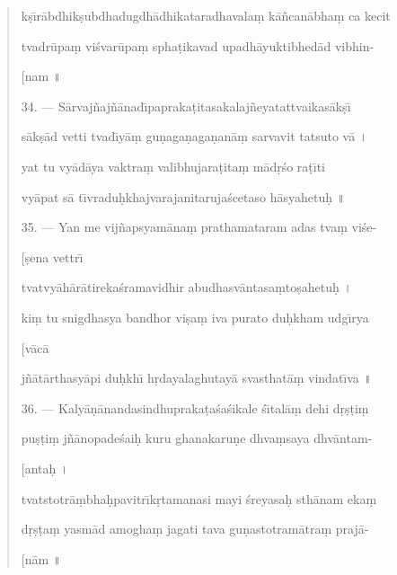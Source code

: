 \documentclass[a4paper, 11pt, oneside, french, landscape, twocolumn]{article}
\begin{document}
\begin{quotation}
k\d{s}\={\i}r\={a}bdhik\d{s}ubdhadugdh\={a}dhikataradhavala\d{m} k\={a}\~{n}can\={a}bha\d{m} ca kecit

tvadr\={u}pa\d{m} vi\'{s}var\={u}pa\d{m} spha\d{t}ikavad upadh\={a}yuktibhed\={a}d vibhin-

\hspace*{55mm}[nam \texthindi{॥}

\bigskip

34. --- S\={a}rvaj\~{n}aj\~{n}\={a}nad\={\i}papraka\d{t}itasakalaj\~{n}eyatattvaikas\={a}k\d{s}\={\i}

s\={a}k\d{s}\={a}d vetti tvad\={\i}y\={a}\d{m} gu\d{n}aga\d{n}aga\d{n}an\={a}\d{m} sarvavit tatsuto v\={a} \texthindi{।}

yat tu vy\={a}d\={a}ya vaktra\d{m} valibhujara\d{t}ita\d{m} m\={a}d\d{r}\'{s}o ra\d{t}\={\i}ti

vy\={a}pat s\={a} t\={\i}vradu\d{h}khajvarajanitaruja\'{s}cetaso h\={a}syahetu\d{h} \texthindi{॥}

\bigskip

35. --- Yan me vij\~{n}apsyam\={a}na\d{m} prathamataram adas tva\d{m} vi\'{s}e-

\hspace*{55mm}[\d{s}ena vettr\={\i}

tvatvy\={a}h\={a}r\={a}tireka\'{s}ramavidhir abudhasv\={a}ntasa\d{m}to\d{s}ahetu\d{h} \texthindi{।}

ki\d{m} tu snigdhasya bandhor vi\d{s}a\d{m} iva purato du\d{h}kham udg\={\i}rya

\hspace*{55mm}[v\={a}c\={a}

j\~{n}\={a}t\={a}rthasy\={a}pi du\d{h}kh\={\i} h\d{r}dayalaghutay\={a} svasthat\={a}\d{m} vindat\={\i}va \texthindi{॥}

\bigskip

36. --- Kaly\={a}\d{n}\={a}nandasindhupraka\d{t}a\'{s}a\'{s}ikale \'{s}\={\i}tal\={a}\d{m} dehi d\d{r}\d{s}\d{t}i\d{m}

pu\d{s}\d{t}i\d{m} j\~{n}\={a}nopade\'{s}ai\d{h} kuru ghanakaru\d{n}e dhva\d{m}saya dhv\={a}ntam-

\hspace*{55mm}[anta\d{h} \texthindi{।}

tvatstotr\={a}\d{m}bha\d{h}pavitr\={\i}k\d{r}tamanasi mayi \'{s}reyasa\d{h} sth\={a}nam eka\d{m}

d\d{r}\d{s}\d{t}a\d{m} yasm\={a}d amogha\d{m} jagati tava gu\d{n}astotram\={a}tra\d{m} praj\={a}-

\hspace*{55mm}[n\={a}m \texthindi{॥}


\end{quotation}
\end{document}

